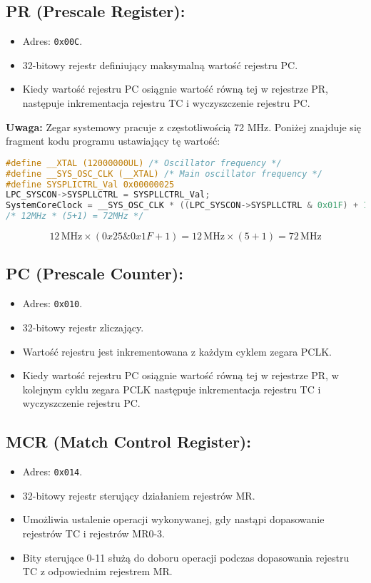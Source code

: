 \documentclass[a4paper,12pt]{report}
\begin{document}
\subsection*{PR (Prescale Register):}
\begin{itemize}
    \item Adres: \texttt{0x00C}.
    \item 32-bitowy rejestr definiujący maksymalną wartość rejestru PC.
    \item Kiedy wartość rejestru PC osiągnie wartość równą tej w rejestrze PR, następuje inkrementacja rejestru TC i wyczyszczenie rejestru PC.
\end{itemize}

\textbf{Uwaga:} Zegar systemowy pracuje z częstotliwością 72 MHz. Poniżej znajduje się fragment kodu programu ustawiający tę wartość:
\begin{lstlisting}[language=C]
#define __XTAL (12000000UL) /* Oscillator frequency */
#define __SYS_OSC_CLK (__XTAL) /* Main oscillator frequency */
#define SYSPLICTRL_Val 0x00000025
LPC_SYSCON->SYSPLLCTRL = SYSPLLCTRL_Val;
SystemCoreClock = __SYS_OSC_CLK * ((LPC_SYSCON->SYSPLLCTRL & 0x01F) + 1);
/* 12MHz * (5+1) = 72MHz */
\end{lstlisting}

\[
12\,\mathrm{MHz} \times (0x25 \& 0x1F + 1) = 12\,\mathrm{MHz} \times (5+1) = 72\,\mathrm{MHz}
\]

\subsection*{PC (Prescale Counter):}
\begin{itemize}
    \item Adres: \texttt{0x010}.
    \item 32-bitowy rejestr zliczający.
    \item Wartość rejestru jest inkrementowana z każdym cyklem zegara PCLK.
    \item Kiedy wartość rejestru PC osiągnie wartość równą tej w rejestrze PR, w kolejnym cyklu zegara PCLK następuje inkrementacja rejestru TC i wyczyszczenie rejestru PC.
\end{itemize}

\subsection*{MCR (Match Control Register):}
\begin{itemize}
    \item Adres: \texttt{0x014}.
    \item 32-bitowy rejestr sterujący działaniem rejestrów MR.
    \item Umożliwia ustalenie operacji wykonywanej, gdy nastąpi dopasowanie rejestrów TC i rejestrów MR0-3.
    \item Bity sterujące 0-11 służą do doboru operacji podczas dopasowania rejestru TC z odpowiednim rejestrem MR.
\end{itemize}
\end{document}
